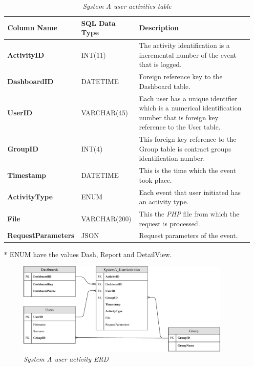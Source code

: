 \begin{table}[!htb]
	\centering
	\small
	\caption[Logging points]
	{\textit{System A user activities table}}
	\label{tbl:PHP_LoggignMechanism}
	\begin{threeparttable}
		\begin{tabularx}{\textwidth}{|l|l|X|}
			\hline \textbf{Column Name} & \textbf{SQL Data Type} & \textbf{Description} \\
			\hline \textbf{ActivityID} & INT(11) & The activity identification is a incremental number of the event that is logged.\\
			\hline \textbf{DashboardID} & DATETIME & Foreign reference key to the Dashboard table.\\
			\hline \textbf{UserID} & VARCHAR(45) & Each user has a unique identifier which is a numerical identification number that is foreign key reference to the User table.\\
			\hline \textbf{GroupID} & INT(4) & This foreign key reference to the Group table is contract groups identification number. \\ 
			\hline \textbf{Timestamp} & DATETIME & This is the time which the event took place.\\			
			\hline \textbf{ActivityType} & ENUM\tnote{*} & Each event that user initiated has an activity type. \\
			\hline \textbf{File} & VARCHAR(200) & This the \emph{PHP} file from which the request is processed.\\
			\hline \textbf{RequestParameters} & JSON & Request parameters of the event. \\
			\hline
		\end{tabularx}
		\begin{tablenotes}
			\item[*] ENUM have the values Dash, Report and DetailView.
		\end{tablenotes}
	\end{threeparttable}
\end{table}

\begin{figure}[!htb] %
	\centering %
	\includegraphics[width=0.95\textwidth]{Images/Chapter2/SystemA_ERD_Basic/SystemA_ERD_Basic.pdf}
	\caption[System A user activity ERD]
	{\textit{System A user activity ERD}}\label{fig:SystemA_Basic_ERD}
\end{figure}

